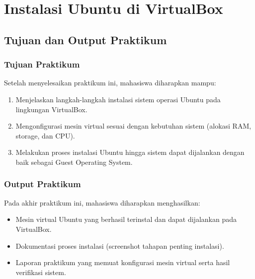 
\chapter{Instalasi Ubuntu di VirtualBox}
\label{chap:modul-02}

\section{Tujuan dan Output Praktikum}

\subsection{Tujuan Praktikum}
Setelah menyelesaikan praktikum ini, mahasiswa diharapkan mampu:
\begin{enumerate}
    \item Menjelaskan langkah-langkah instalasi sistem operasi Ubuntu pada lingkungan VirtualBox.
    \item Mengonfigurasi mesin virtual sesuai dengan kebutuhan sistem (alokasi RAM, storage, dan CPU).
    \item Melakukan proses instalasi Ubuntu hingga sistem dapat dijalankan dengan baik sebagai Guest Operating System.
\end{enumerate}

\subsection{Output Praktikum}
Pada akhir praktikum ini, mahasiswa diharapkan menghasilkan:
\begin{itemize}
    \item Mesin virtual Ubuntu yang berhasil terinstal dan dapat dijalankan pada VirtualBox.
    \item Dokumentasi proses instalasi (screenshot tahapan penting instalasi).
    \item Laporan praktikum yang memuat konfigurasi mesin virtual serta hasil verifikasi sistem.
\end{itemize}



